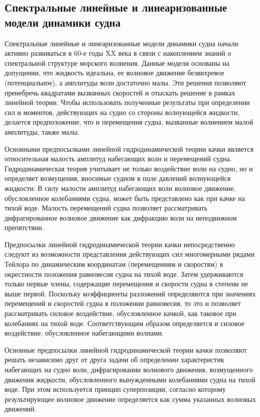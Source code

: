 \subsection{Спектральные линейные и линеаризованные \mbox{модели} динамики судна}
Спектральные линейные и линеаризованные модели динамики судна начали активно развиваться в 60-е годы XX века в связи с накоплением знаний о спектральной структуре морского волнения. Данные модели основаны на допущении, что жидкость идеальна, ее волновое движение безвихревое (потенциальное), а амплитуды волн достаточно малы. Эти решения позволяют пренебречь квадратами вызванных скоростей и отыскать решение в рамках линейной теории. Чтобы использовать полученные результаты при определении сил и моментов, действующих на судно со стороны волнующейся жидкости, делается предположение, что и перемещения судна, вызванные волнением малой амплитуды, также малы.

Основными предпосылками линейной гидродинамической теории качки является относительная малость амплитуд набегающих волн и перемещений судна. Гидродинамическая теория учитывает не только воздействие волн на судно, но и определяет возмущения, вносимые судном в поле давлений волнующейся жидкости. В силу малости амплитуд набегающих волн волновое движение, обусловленное колебаниями судна, может быть представлено как при качке на тихой воде. Малость перемещений судна позволяет рассматривать дифрагированное волновое движение как дифракцию волн на неподвижном препятствии.

Предпосылки линейной гидродинамической теории качки непосредственно следуют из возможности представления действующих сил многомерными рядами Тейлора по динамическим координатам (перемещениям и скоростям) в окрестности положения равновесия судна на тихой воде. Затем удерживаются только первые члены, содержащие перемещения и скорости судна в степени не выше первой. Поскольку коэффициенты разложений определяются при значениях перемещений и скоростей судна в положении равновесия, то это и позволяет рассматривать силовое воздействие, обусловленное качкой, как таковое при колебаниях на тихой воде. Соответствующим образом определяется и силовое воздействие, обусловленное набегающими волнами.

Основные предпосылки линейной гидродинамической теории качки позволяют решать независимо друг от друга задачи об определении характеристик набегающих на судно волн, дифрагировании волнового движения, возмущенного движения жидкости, обусловленного вынужденными колебаниями судна на тихой воде. При этом используется принцип суперпозиции, согласно которому результирующее волновое движение определяется как сумма указанных волновых движений. 

